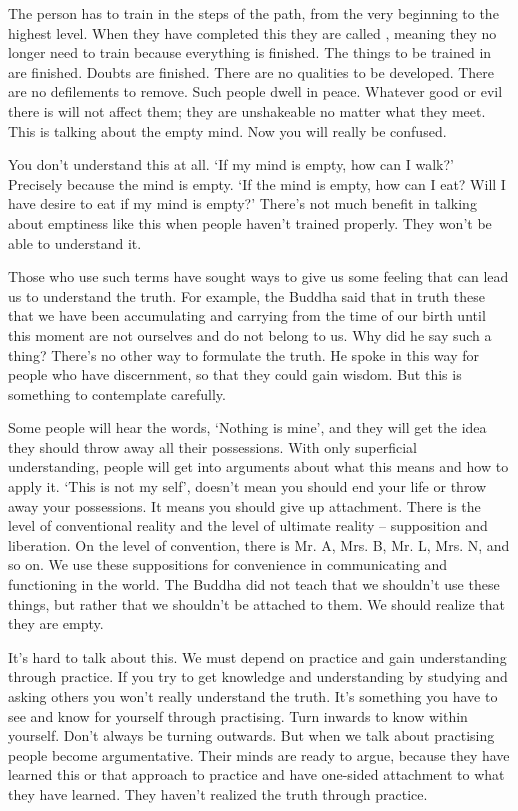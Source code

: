 The  person has to train in the steps of the path, from the very beginning to the highest level. When they have completed this they are called , meaning they no longer need to train because everything is finished. The things to be trained in are finished. Doubts are finished. There are no qualities to be developed. There are no defilements to remove. Such people dwell in peace. Whatever good or evil there is will not affect them; they are unshakeable no matter what they meet. This is talking about the empty mind. Now you will really be confused. 

You don't understand this at all. `If my mind is empty, how can I walk?' Precisely because the mind is empty. `If the mind is empty, how can I eat? Will I have desire to eat if my mind is empty?' There's not much benefit in talking about emptiness like this when people haven't trained properly. They won't be able to understand it. 

Those who use such terms have sought ways to give us some feeling that can lead us to understand the truth. For example, the Buddha said that in truth these  that we have been accumulating and carrying from the time of our birth until this moment are not ourselves and do not belong to us. Why did he say such a thing? There's no other way to formulate the truth. He spoke in this way for people who have discernment, so that they could gain wisdom. But this is something to contemplate carefully. 

Some people will hear the words, `Nothing is mine', and they will get the idea they should throw away all their possessions. With only superficial understanding, people will get into arguments about what this means and how to apply it. `This is not my self', doesn't mean you should end your life or throw away your possessions. It means you should give up attachment. There is the level of conventional reality and the level of ultimate reality -- supposition and liberation. On the level of convention, there is Mr. A, Mrs. B, Mr. L, Mrs. N, and so on. We use these suppositions for convenience in communicating and functioning in the world. The Buddha did not teach that we shouldn't use these things, but rather that we shouldn't be attached to them. We should realize that they are empty. 

It's hard to talk about this. We must depend on practice and gain understanding through practice. If you try to get knowledge and understanding by studying and asking others you won't really understand the truth. It's something you have to see and know for yourself through practising. Turn inwards to know within yourself. Don't always be turning outwards. But when we talk about practising people become argumentative. Their minds are ready to argue, because they have learned this or that approach to practice and have one-sided attachment to what they have learned. They haven't realized the truth through practice. 

